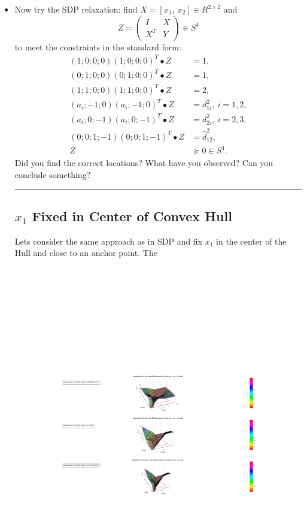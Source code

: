 \documentclass{article} %
\begin{document}
\begin{itemize}
\rule{\textwidth}{1pt}



\item Now try the SDP relaxation: find $X=[x_1,\ x_2]\in R^{2\times 2}$ and
\[Z=\left(\begin{array}{cc}
              I & X\\
              X^T& Y\end{array}\right)\in S^4
\]
to meet the constraints in the standard form:
\[\begin{array}{cl}
(1;0;0;0)(1;0;0;0)^T\bullet Z &=1,\\
(0;1;0;0)(0;1;0;0)^T\bullet Z& =1,\\
(1;1;0;0)(1;1;0;0)^T\bullet Z& =2,\\
(a_i;-1;0)(a_i;-1;0)^T\bullet Z &= d^2_{1i},\ i=1,2,\\
(a_i;0;-1)(a_i;0;-1)^T\bullet Z &= d^2_{2i},\ i=2,3,\\
(0;0;1;-1)(0;0;1;-1)^T\bullet Z&=\hat{d}^2_{12},\\
Z &\succeq 0\in S^4.
\end{array}
\]
Did you find the correct locations? What have you observed? Can you conclude something? 

\rule{\textwidth}{1pt}

\subsection*{$x_1$ Fixed in Center of Convex Hull}

Lets consider the same approach as in SDP and fix $x_1$ in the center of the Hull and close to an anchor point. The 
\begin{figure}[H]
\centering
\includegraphics[width=\textwidth,height=15cm]{SDPCenter.png}
\end{figure}


\end{itemize}
\end{document}
